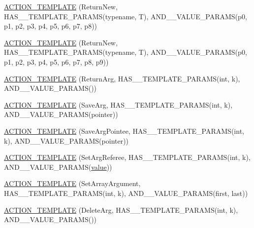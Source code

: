 \begin{DoxyCompactItemize}
\item 
\mbox{\hyperlink{namespacetesting_adfb5791a941ec1f2a2f8067fd9ac7667}{A\+C\+T\+I\+O\+N\+\_\+\+T\+E\+M\+P\+L\+A\+TE}} (Return\+New, H\+A\+S\+\_\+\_\+\+T\+E\+M\+P\+L\+A\+T\+E\+\_\+\+P\+A\+R\+A\+MS(typename, T), A\+N\+D\+\_\+\_\+\+V\+A\+L\+U\+E\+\_\+\+P\+A\+R\+A\+MS(p0, p1, p2, p3, p4, p5, p6, p7, p8))
\item 
\mbox{\hyperlink{namespacetesting_a3934a47f6125504c939a3573b7fc55c4}{A\+C\+T\+I\+O\+N\+\_\+\+T\+E\+M\+P\+L\+A\+TE}} (Return\+New, H\+A\+S\+\_\+\_\+\+T\+E\+M\+P\+L\+A\+T\+E\+\_\+\+P\+A\+R\+A\+MS(typename, T), A\+N\+D\+\_\+\_\+\+V\+A\+L\+U\+E\+\_\+\+P\+A\+R\+A\+MS(p0, p1, p2, p3, p4, p5, p6, p7, p8, p9))
\item 
\mbox{\hyperlink{namespacetesting_a109d48f969260878ed1e743006196992}{A\+C\+T\+I\+O\+N\+\_\+\+T\+E\+M\+P\+L\+A\+TE}} (Return\+Arg, H\+A\+S\+\_\+\_\+\+T\+E\+M\+P\+L\+A\+T\+E\+\_\+\+P\+A\+R\+A\+MS(int, k), A\+N\+D\+\_\+\_\+\+V\+A\+L\+U\+E\+\_\+\+P\+A\+R\+A\+MS())
\item 
\mbox{\hyperlink{namespacetesting_a0478a3464d31f6726d5bc47b1be46491}{A\+C\+T\+I\+O\+N\+\_\+\+T\+E\+M\+P\+L\+A\+TE}} (Save\+Arg, H\+A\+S\+\_\+\_\+\+T\+E\+M\+P\+L\+A\+T\+E\+\_\+\+P\+A\+R\+A\+MS(int, k), A\+N\+D\+\_\+\_\+\+V\+A\+L\+U\+E\+\_\+\+P\+A\+R\+A\+MS(pointer))
\item 
\mbox{\hyperlink{namespacetesting_a31565a90ad7f08c1a88e4b138957172c}{A\+C\+T\+I\+O\+N\+\_\+\+T\+E\+M\+P\+L\+A\+TE}} (Save\+Arg\+Pointee, H\+A\+S\+\_\+\_\+\+T\+E\+M\+P\+L\+A\+T\+E\+\_\+\+P\+A\+R\+A\+MS(int, k), A\+N\+D\+\_\+\_\+\+V\+A\+L\+U\+E\+\_\+\+P\+A\+R\+A\+MS(pointer))
\item 
\mbox{\hyperlink{namespacetesting_adfd3c9538285d257370f955aa81488f1}{A\+C\+T\+I\+O\+N\+\_\+\+T\+E\+M\+P\+L\+A\+TE}} (Set\+Arg\+Referee, H\+A\+S\+\_\+\_\+\+T\+E\+M\+P\+L\+A\+T\+E\+\_\+\+P\+A\+R\+A\+MS(int, k), A\+N\+D\+\_\+\_\+\+V\+A\+L\+U\+E\+\_\+\+P\+A\+R\+A\+MS(\mbox{\hyperlink{_obj__test_2lib_2googletest-master_2googlemock_2test_2gmock-matchers__test_8cc_a337b8a670efc0b086ad3af163f3121b6}{value}}))
\item 
\mbox{\hyperlink{namespacetesting_a2b0f090219db3bb0630d5ce6f7d911d8}{A\+C\+T\+I\+O\+N\+\_\+\+T\+E\+M\+P\+L\+A\+TE}} (Set\+Array\+Argument, H\+A\+S\+\_\+\_\+\+T\+E\+M\+P\+L\+A\+T\+E\+\_\+\+P\+A\+R\+A\+MS(int, k), A\+N\+D\+\_\+\_\+\+V\+A\+L\+U\+E\+\_\+\+P\+A\+R\+A\+MS(first, last))
\item 
\mbox{\hyperlink{namespacetesting_a37a5ebfe68fd8dedf8bd82a5ebddcb7b}{A\+C\+T\+I\+O\+N\+\_\+\+T\+E\+M\+P\+L\+A\+TE}} (Delete\+Arg, H\+A\+S\+\_\+\_\+\+T\+E\+M\+P\+L\+A\+T\+E\+\_\+\+P\+A\+R\+A\+MS(int, k), A\+N\+D\+\_\+\_\+\+V\+A\+L\+U\+E\+\_\+\+P\+A\+R\+A\+MS())

\end{DoxyCompactItemize}
